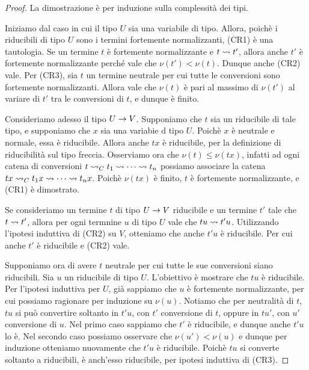 \documentclass[]{marticle}
\begin{document}
\begin{proof}
    La dimostrazione \`e per induzione sulla complessit\`a dei tipi.

    Iniziamo dal caso in cui il tipo $U$ sia una variabile di tipo. Allora,
    poich\`e i riducibili di tipo $U$ sono i termini fortemente normalizzanti,
    (CR1) \`e una tautologia. Se un termine $t$ \`e fortemente normalizzante e
    $t\rightsquigarrow t'$, allora anche $t'$ \`e fortemente normalizzante perch\'e vale
    che $\nu(t')<\nu(t)$. Dunque anche (CR2) vale. Per (CR3), sia $t$ un termine
    neutrale per cui tutte le conversioni sono fortemente normalizzanti. Allora
    vale che $\nu(t)$ \`e pari al massimo di $\nu(t')$ al variare di $t'$ tra le
    conversioni di $t$, e dunque \`e finito.

    Consideriamo adesso il tipo $U\rightarrow V$.  Supponiamo che $t$ sia un riducibile
    di tale tipo, e supponiamo che $x$ sia una variabie d tipo $U$. Poich\`e $x$
    \`e neutrale e normale, essa \`e riducibile. Allora anche $tx$ \`e
    riducibile, per la definizione di riducibilit\`a sul tipo freccia.
    Osserviamo ora che $\nu(t)\leq \nu(tx)$, infatti ad ogni catena di
    conversioni $t\rightsquigarrow_C t_1 \rightsquigarrow\cdots \rightsquigarrow t_n$ possiamo associare la
    catena $tx \rightsquigarrow_C t_1 x \rightsquigarrow\cdots \rightsquigarrow t_n x$. Poich\`e $\nu(tx)$ \`e
    finito, $t$ \`e fortemente normalizzante, e (CR1) \`e dimostrato.

    Se consideriamo un termine $t$ di tipo $U\rightarrow V$ riducibile e un termine
    $t'$ tale che $t\rightsquigarrow t'$, allora per ogni termnine $u$ di tipo $U$ vale che
    $tu\rightsquigarrow t'u$. Utilizzando l'ipotesi induttiva di (CR2) su $V$, otteniamo
    che anche $t'u$ \`e riducibile. Per cui anche $t'$ \`e riducibile e (CR2)
    vale.

    Supponiamo ora di avere $t$ neutrale per cui tutte le sue conversioni siano
    riducibili. Sia $u$ un riducibile di tipo $U$. L'obiettivo \`e mostrare che
    $tu$ \`e riducibile. Per l'ipotesi induttiva per $U$, gi\`a sappiamo che $u$
    \`e fortemente normalizzante, per cui possiamo ragionare per induzione su
    $\nu(u)$. Notiamo che per neutralit\`a di $t$, $tu$ si pu\`o convertire
    soltanto in $t'u$, con $t'$ conversione di $t$, oppure in $tu'$, con $u'$
    conversione di $u$. Nel primo caso sappiamo che $t'$ \`e riducibile, e
    dunque anche $t'u$ lo \`e. Nel secondo caso possiamo osservare che $\nu(u')
    < \nu(u)$ e dunque per induzione otteniamo nuovamente che $t'u$ \`e
    riducibile. Poich\`e $tu$ si converte soltanto a riducibili, \`e anch'esso
    riducibile, per ipotesi induttiva di (CR3). 
\end{proof}
\end{document}
